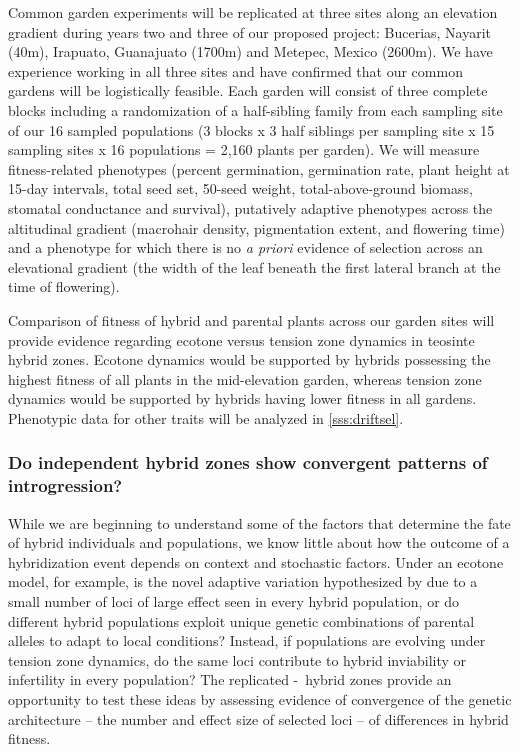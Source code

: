 Common garden experiments will be replicated at three sites along an elevation gradient during years two and three of our proposed project: Bucerias, Nayarit (40m), Irapuato, Guanajuato (1700m) and Metepec, Mexico (2600m).
We have experience working in all three sites and have confirmed that our common gardens will be logistically feasible.
Each garden will consist of three complete blocks including a randomization of a half-sibling family from each sampling site of our 16 sampled populations (3 blocks x 3 half siblings per sampling site x 15 sampling sites x 16 populations = 2,160 plants per garden).  
We will measure fitness-related phenotypes (percent germination, germination rate, plant height at 15-day intervals, total seed set, 50-seed weight, total-above-ground biomass, stomatal conductance and survival), putatively adaptive phenotypes across the altitudinal gradient (macrohair density, pigmentation extent, and flowering time) and a phenotype for which there is no \emph{a priori} evidence of selection across an elevational gradient (the width of the leaf beneath the first lateral branch at the time of flowering).  

Comparison of fitness of hybrid and parental plants across our garden sites will provide evidence regarding ecotone versus tension zone dynamics in teosinte hybrid zones.  
Ecotone dynamics would be supported by hybrids possessing the highest fitness of all plants in the mid-elevation garden, whereas tension zone dynamics would be supported by hybrids having lower fitness in all gardens.
Phenotypic data for other traits will be analyzed in \ref{sss:driftsel}.

\subsubsection{Do independent hybrid zones show convergent patterns of introgression?}
\label{sss:genomescan}

While we are beginning to understand some of the factors that determine the fate of hybrid individuals and populations, we know little about how the outcome of a hybridization event depends on context and stochastic factors. 
Under an ecotone model, for example, is the novel adaptive variation hypothesized by \citet{Anderson1954} due to a small number of loci of large effect seen in every hybrid population, or do different hybrid populations exploit unique genetic combinations of parental alleles to adapt to local conditions?
Instead, if populations are evolving under tension zone dynamics, do the same loci contribute to hybrid inviability or infertility in every population?
The replicated \zm-\zp\ hybrid zones provide an opportunity to test these ideas by assessing evidence of convergence of the genetic architecture -- the number and effect size of selected loci -- of differences in hybrid fitness.


